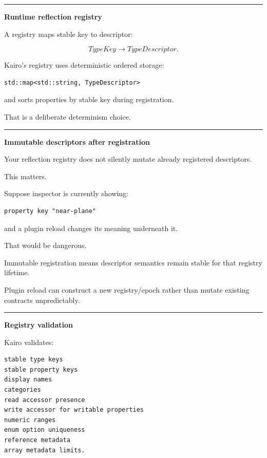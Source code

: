 \begin{center}\rule{0.5\linewidth}{0.5pt}\end{center}

\textbf{Runtime reflection registry}

A registry maps stable key to descriptor:

\[
TypeKey
\rightarrow
TypeDescriptor.
\]

Kairo's registry uses deterministic ordered storage:

\begin{verbatim}
std::map<std::string, TypeDescriptor>
\end{verbatim}

and sorts properties by stable key during registration.

That is a deliberate determinism choice.

\begin{center}\rule{0.5\linewidth}{0.5pt}\end{center}

\textbf{Immutable descriptors after registration}

Your reflection registry does not silently mutate already registered descriptors.

This matters.

Suppose inspector is currently showing:

\begin{verbatim}
property key "near-plane"
\end{verbatim}

and a plugin reload changes its meaning underneath it.

That would be dangerous.

Immutable registration means descriptor semantics remain stable for that registry lifetime.

Plugin reload can construct a new registry/epoch rather than mutate existing contracts unpredictably.

\begin{center}\rule{0.5\linewidth}{0.5pt}\end{center}

\textbf{Registry validation}

Kairo validates:

\begin{verbatim}
stable type keys
stable property keys
display names
categories
read accessor presence
write accessor for writable properties
numeric ranges
enum option uniqueness
reference metadata
array metadata limits.
\end{verbatim}

